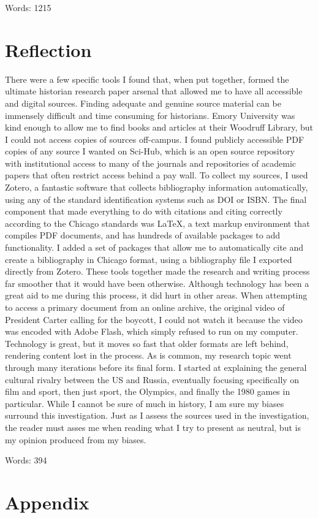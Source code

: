 \documentclass[12pt,letterpaper]{article}
\begin{document}
Words: 1215

\newpage
\section{Reflection}
There were a few specific tools I found that, when put together, formed the ultimate historian research paper arsenal that allowed me to have all accessible and digital sources. Finding adequate and genuine source material can be immensely difficult and time consuming for historians. Emory University was kind enough to allow me to find books and articles at their Woodruff Library, but I could not access copies of sources off-campus. I found publicly accessible PDF copies of any source I wanted on Sci-Hub, which is an open source repository with institutional access to many of the journals and repositories of academic papers that often restrict access behind a pay wall. To collect my sources, I used Zotero, a fantastic software that collects bibliography information automatically, using any of the standard identification systems such as DOI or ISBN. The final component that made everything to do with citations and citing correctly according to the Chicago standards was \LaTeX{}, a text markup environment that compiles PDF documents, and has hundreds of available packages to add functionality. I added a set of packages that allow me to automatically cite and create a bibliography in Chicago format, using a bibliography file I exported directly from Zotero. These tools together made the research and writing process far smoother that it would have been otherwise. Although technology has been a great aid to me during this process, it did hurt in other areas. When attempting to access a primary document from an online archive, the original video of President Carter calling for the boycott, I could not watch it because the video was encoded with Adobe Flash, which simply refused to run on my computer. Technology is great, but it moves so fast that older formats are left behind, rendering content lost in the process. As is common, my research topic went through many iterations before its final form. I started at explaining the general cultural rivalry between the US and Russia, eventually focusing specifically on film and sport, then just sport, the Olympics, and finally the 1980 games in particular. While I cannot be sure of much in history, I am sure my biases surround this investigation. Just as I assess the sources used in the investigation, the reader must asses me when reading what I try to present as neutral, but is my opinion produced from my biases. 

Words: 394

\newpage
\nocite{*}
\printbibliography

\newpage
\section{Appendix}
\listoffigures
\end{document}
